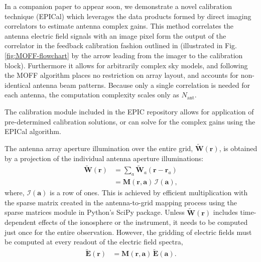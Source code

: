 \documentclass[a4paper,fleqn,usenatbib]{../mnras}
\begin{document}
In a companion paper to appear soon, we demonstrate a novel calibration 
technique (EPICal) which leverages the data products formed by direct imaging 
correlators to estimate antenna complex gains. This method correlates the antenna 
electric field signals with an image pixel form the output of the correlator in 
the feedback calibration fashion outlined in \citealt{mor11} (illustrated in Fig. 
\ref{fig:MOFF-flowchart} by the arrow leading from the imager to the calibration 
block). Furthermore it allows for arbitrarily complex sky models, and following 
the MOFF algorithm places no restriction on array layout, and accounts for 
non-identical antenna beam patterns. Because only a single correlation is needed 
for each antenna, the computation complexity scales only as $N_{\mathrm{ant}}$. 

The calibration module included in the EPIC repository allows for application of 
pre-determined calibration solutions, or can solve for the complex gains using 
the EPICal algorithm.

\par\medskip
{}
\par\medskip
\noindent The antenna array aperture illumination over the entire grid,
$\widetilde{\mathbf{W}}(\mathbf{r})$, is obtained by a projection of the 
individual antenna aperture illuminations:
\begin{align}\label{eqn:gridding-convolution}
  \widetilde{\mathbf{W}}(\mathbf{r}) &= \sum_a \widetilde{\mathbf{W}}_a(\mathbf{r}-\mathbf{r}_a) \\
                            &= \mathbf{M}(\mathbf{r},\mathbf{a})\,\mathcal{I}(\mathbf{a}),
\end{align}
where, $\mathcal{I}(\mathbf{a})$ is a row of ones. This is achieved by
efficient multiplication with the sparse matrix created in the antenna-to-grid
mapping process using the sparse matrices module in Python's SciPy package. 
Unless $\widetilde{\mathbf{W}}(\mathbf{r})$ includes time-dependent
effects of the ionosphere or the instrument, it needs to be computed just once
for the entire observation. However, the gridding of electric fields must be
computed at every readout of the electric field spectra,
\begin{align}
  \widetilde{\mathbf{E}}(\mathbf{r}) &= \mathbf{M}(\mathbf{r},\mathbf{a})\,\widetilde{\mathbf{E}}(\mathbf{a}).
\end{align}
\end{document}
